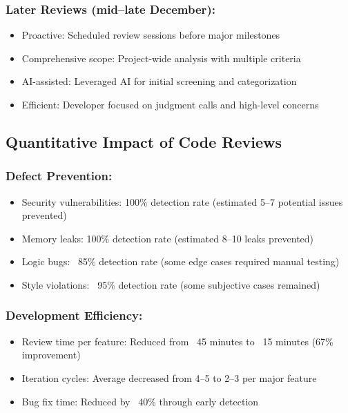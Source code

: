 \documentclass[12pt,a4paper]{article}
\begin{document}
\subsubsection*{Later Reviews (mid--late December):}
\begin{itemize}
    \item Proactive: Scheduled review sessions before major milestones
    \item Comprehensive scope: Project-wide analysis with multiple criteria
    \item AI-assisted: Leveraged AI for initial screening and categorization
    \item Efficient: Developer focused on judgment calls and high-level concerns
\end{itemize}

\subsection{Quantitative Impact of Code Reviews}

\subsubsection*{Defect Prevention:}
\begin{itemize}
    \item Security vulnerabilities: 100\% detection rate (estimated 5--7 potential issues prevented)
    \item Memory leaks: 100\% detection rate (estimated 8--10 leaks prevented)
    \item Logic bugs: ~85\% detection rate (some edge cases required manual testing)
    \item Style violations: ~95\% detection rate (some subjective cases remained)
\end{itemize}

\subsubsection*{Development Efficiency:}
\begin{itemize}
    \item Review time per feature: Reduced from ~45 minutes to ~15 minutes (67\% improvement)
    \item Iteration cycles: Average decreased from 4--5 to 2--3 per major feature
    \item Bug fix time: Reduced by ~40\% through early detection
\end{itemize}
\end{document}
